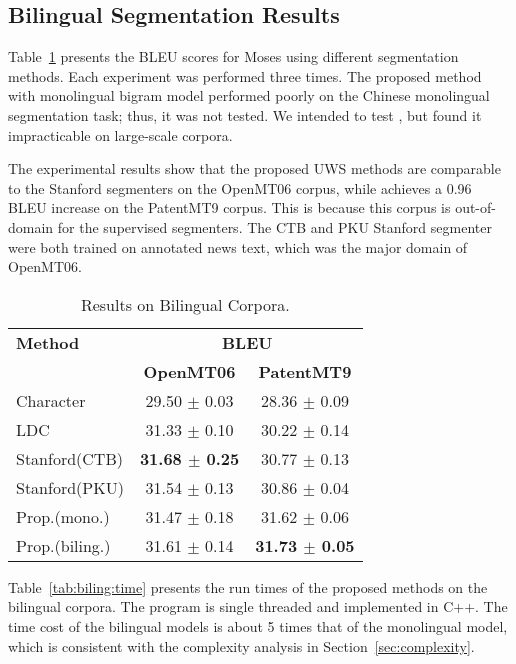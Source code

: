 \documentclass[11pt]{article}
\begin{document}
\subsection{Bilingual Segmentation Results}

Table~\ref{tab:biling:acc} presents the BLEU scores for Moses using
different segmentation methods. Each experiment was performed three
times.  The proposed method with monolingual bigram model performed poorly on the
Chinese monolingual segmentation task; thus, it was not tested. We intended to test \cite{mochihashi2009bayesian}, but found it impracticable on large-scale corpora.

The experimental results show that the proposed UWS methods are comparable to the Stanford segmenters on the OpenMT06 corpus, while achieves a 0.96 BLEU increase on the PatentMT9 corpus. This is because this corpus is out-of-domain for the  supervised segmenters. The CTB and PKU Stanford segmenter were both trained on annotated news text, which was the major domain of OpenMT06. 


\begin{table}{\small
\begin{center}
\begin{tabular}{|l|cc|}
\hline
\bf Method &\multicolumn{2}{|c|}{\bf BLEU} \\
 &\bf OpenMT06 & \bf PatentMT9     \\
 \hline 
Character                   & 29.50 $\pm$ 0.03 & 28.36 $\pm$ 0.09 \\
LDC                         & 31.33 $\pm$ 0.10 & 30.22 $\pm$ 0.14 \\
Stanford(CTB)               & {\bf 31.68 $\pm$ 0.25} & 30.77 $\pm$ 0.13\\ 
Stanford(PKU)               & 31.54 $\pm$ 0.13 & 30.86 $\pm$ 0.04  \\
\hline
Prop.(mono.)                    & 31.47 $\pm$ 0.18 & 31.62 $\pm$ 0.06  \\    
Prop.(biling.)               &  31.61 $\pm$ 0.14 &{\bf  31.73 $\pm$ 0.05}    \\ 
\hline
\end{tabular}
\end{center}
\caption{\label{tab:biling:acc} Results on Bilingual Corpora.}
}\end{table}

Table~\ref{tab:biling:time} presents the run times of the proposed methods on
the bilingual corpora.  The program is single threaded and implemented in C++. The time cost of the bilingual models is about
 5 times that of the monolingual model, which is consistent with
the complexity analysis in Section~\ref{sec:complexity}.
\end{document}
